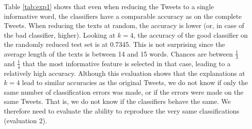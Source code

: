 \noindent Table \ref{tab:exp1} shows that even when reducing the Tweets to a single informative word, the classifiers have a comparable accuracy as on the complete Tweets. When reducing the texts at random, the accuracy is lower (or, in case of the bad classifier, higher). Looking at $k=4$, the accuracy of the good classifier on the randomly reduced test set is at 0.7345. This is not surprising since the average length of the texts is between 14 and 15 words. Chances are between $\frac{1}{3}$ and $\frac{1}{4}$ that the most informative feature is selected in that case, leading to a relatively high accuracy.\newline
Although this evaluation shows that the explanations at $k=4$ lead to similar accuracies as the original Tweets, we do not know if only the same number of classification errors was made, or if the errors were made on the same Tweets. That is, we do not know if the classifiers behave the same. We therefore need to evaluate the ability to reproduce the very same classifications (evaluation 2).


